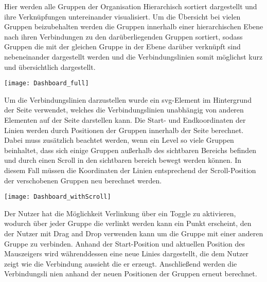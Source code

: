 Hier werden alle Gruppen der Organisation Hierarchisch sortiert dargestellt und ihre Verknüpfungen untereinander visualisiert.
Um die Übersicht bei vielen Gruppen beizubehalten werden die Gruppen innerhalb einer hierarchischen Ebene nach ihren Verbindungen zu den darüberliegenden Gruppen sortiert, sodass Gruppen die mit der gleichen Gruppe in der Ebene darüber verknüpft sind nebeneinander dargestellt werden und die Verbindungslinien somit möglichst kurz und übersichtlich dargestellt.

\vspace{20pt}
\begin{center}
    \begin{minipage}{1\linewidth}
        \texttt{[image: Dashboard\_full]}
    \end{minipage}
\end{center}
\vspace{20pt}

Um die Verbindungslinien darzustellen wurde ein svg-Element im Hintergrund der Seite verwendet, welches die Verbindungslinien unabhängig von anderen Elementen auf der Seite darstellen kann. Die Start- und Endkoordinaten der Linien werden durch Positionen der Gruppen innerhalb der Seite berechnet. Dabei muss zusätzlich beachtet werden, wenn ein Level so viele Gruppen beinhaltet, dass sich einige Gruppen außerhalb des sichtbaren Bereichs befinden und durch einen Scroll in den sichtbaren bereich bewegt werden können. In diesem Fall müssen die Koordinaten der Linien entsprechend der Scroll-Position der verschobenen Gruppen neu berechnet werden.

\vspace{20pt}
\begin{center}
    \begin{minipage}{1\linewidth}
        \texttt{[image: Dashboard\_withScroll]}
    \end{minipage}
\end{center}
\vspace{20pt}

Der Nutzer hat die Möglichkeit Verlinkung über ein Toggle zu aktivieren, wodurch über jeder Gruppe die verlinkt werden kann ein Punkt erscheint, den der Nutzer mit Drag and Drop verwenden kann um die Gruppe mit einer anderen Gruppe zu verbinden.
Anhand der Start-Position und aktuellen Position des Mauszeigers wird währenddessen eine neue Linies dargestellt, die dem Nutzer zeigt wie die Verbindung aussieht die er erzeugt. Anschließend werden die Verbindungsli
nien anhand der neuen Positionen der Gruppen erneut berechnet.

